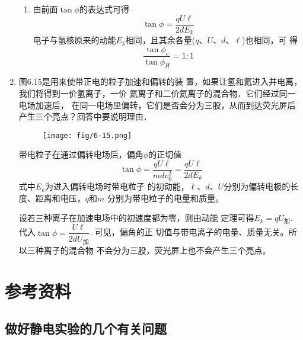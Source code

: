 \begin{enumerate}
\begin{solution}
\begin{enumerate}
\item 由前面$\tan\phi$的表达式可得
\[\tan\phi=\frac{qU\ell}{2dE_k}\]
电子与氢核原来的动能$E_k$相同，且其余各量($q$、$U$、$d$、$\ell$)也相同，可
得
\[\frac{\tan\phi_e}{\tan\phi_H}=1:1\]
\end{enumerate}
\end{solution}

\item 图6.15是用来使带正电的粒子加速和偏转的装
置，如果让氢和氦进入并电离，我们将得到一价氢离子，一价
氦离子和二价氦离子的混合物．它们经过同一电场加速后，
在同一电场里偏转，它们是否会分为三股，从而到达荧光屏后
产生三个亮点？回答中要说明理由．

\begin{figure}[htp]\centering
    \texttt{[image: fig/6-15.png]}
        \caption{}
        \end{figure}

\begin{solution}
    带电粒子在通过偏转电场后，偏角$\phi$的正切值
    \[\tan\phi=\frac{qU\ell}{mdv_0^2}=\frac{qU\ell}{2dE_k}\]
式中$E_k$为进入偏转电场时带电粒子
    的初动能，$\ell$、$d$、$U$分别为偏转电极的长度、距离和电压，$q$和$m$
    分别为带电粒子的电量和质量。

    设若三种离子在加速电场中的初速度都为零，则由动能
    定理可得$E_k=qU_{\text{加}}$. 代入$\tan\phi=\dfrac{U\ell }{2dU_{\text{加}}}$. 可见，偏角的正
    切值与带电离子的电量、质量无关。所以三种离子的混合物
    不会分为三股，荧光屏上也不会产生三个亮点。
\end{solution}

\end{enumerate}


























\section{参考资料}
\subsection{做好静电实验的几个有关问题}
